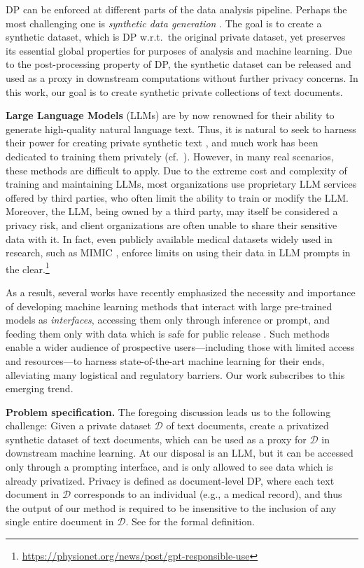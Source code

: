 DP can be enforced at different parts of the data analysis pipeline. Perhaps the most challenging one is \emph{synthetic data generation} \cite{ponomareva2023dp}. 
The goal is to create a synthetic dataset, which is DP w.r.t.~the original private dataset, yet preserves its essential global properties for purposes of analysis and machine learning. Due to the post-processing property of DP, the synthetic dataset can be released and used as a proxy in downstream computations without further privacy concerns. 
In this work, our goal is to create synthetic private collections of text documents.

\noindent\textbf{Large Language Models} (LLMs)
are by now renowned for their ability to generate high-quality natural language text. 
Thus, it is natural to seek to harness their power for creating private synthetic text \cite{hu2023sok}, and much work has been dedicated to training them privately (cf.~). 
However, in many real scenarios, these methods are difficult to apply. Due to the extreme cost and complexity of training and maintaining LLMs, most organizations use proprietary LLM services offered by third parties, who often limit the ability to train or modify the LLM. Moreover, the LLM, being owned by a third party, may itself be considered a privacy risk, and client organizations are often unable to share their sensitive data with it. 
In fact, even publicly available medical datasets widely used in research, such as MIMIC \cite{goldberger2000physiobank}, enforce limits on using their data in LLM prompts in the clear.\footnote{\url{https://physionet.org/news/post/gpt-responsible-use}}


As a result, several works have recently emphasized the necessity and importance of developing machine learning methods that interact with large pre-trained models as \emph{interfaces}, accessing them only through inference or prompt, and feeding them only with data which is safe for public release \cite{pryzant-etal-2023-automatic,duan2023flocks,lin2023differentially,cohen2023hot}. 
Such methods enable a wider audience of prospective users---including those with limited access and resources---to harness state-of-the-art machine learning for their ends, alleviating many logistical and regulatory barriers. 
Our work subscribes to this emerging trend. 

\noindent\textbf{Problem specification.}
The foregoing discussion leads us to the following challenge: 
Given a private dataset $\mathcal D$ of text documents, create a privatized synthetic dataset of text documents, which can be used as a proxy for $\mathcal D$ in downstream machine learning. At our disposal is an LLM, but it can be accessed only through a prompting interface, and is only allowed to see data which is already privatized. Privacy is defined as document-level DP, where each text document in $\mathcal D$ corresponds to an individual (e.g., a medical record), and thus the output of our method is required to be insensitive to the inclusion of any single entire document in $\mathcal D$. See  for the formal definition.

